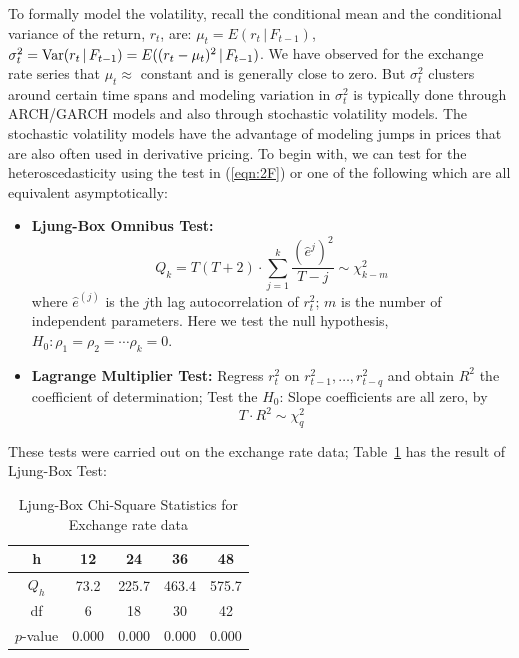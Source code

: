 To formally model the volatility, recall the conditional mean and the conditional variance of the return, $r_t$, are: $\mu_t = E(r_t \,|\,F_{t-1})$, $\sigma_t^2 = \operatorname{Var}(r_t\,|\,F_{t-1}) = E((r_t - \mu_t)^2\,|\,F_{t-1})$. We have observed for the exchange rate series that $\mu_t \approx$ constant and is generally close to zero. But $\sigma_t^2$ clusters around certain time spans and modeling variation in $\sigma_t^2$ is typically done through ARCH/GARCH models and also through stochastic volatility models. The stochastic volatility models have the advantage of modeling jumps in prices that are also often used in derivative pricing. To begin with, we can test for the heteroscedasticity using the test in (\ref{eqn:2F}) or one of the following which are all equivalent asymptotically:
\begin{itemize}
\item \textbf{Ljung-Box Omnibus Test:}
	\begin{equation}\label{eqn:2Qk}
	Q_k = T(T+2) \cdot \sum_{j=1}^k\frac{(\hat{e}^{j})^2}{T - j} \sim \chi_{k-m}^2
	\end{equation}
where $\hat{e}^{(j)}$ is the $j$th lag autocorrelation of $r_t^2$; $m$ is the number of independent parameters. Here we test the null hypothesis, $H_0: \rho_1 = \rho_2 = \cdots \rho_k = 0$.

\item \textbf{Lagrange Multiplier Test:} Regress $r_t^2$ on $r_{t-1}^2,\ldots,r_{t-q}^2$ and obtain $R^2$ the coefficient of determination; Test the $H_0$: Slope coefficients are all zero, by
	\begin{equation}\label{eqn:2TstarR}
	T \cdot R^2 \sim \chi_q^2
	\end{equation}
\end{itemize}
These tests were carried out on the exchange rate data; Table~\ref{tab:box} has the result of Ljung-Box Test: 
\begin{table}[!ht]
\centering
\caption{Ljung-Box Chi-Square Statistics for Exchange rate data \label{tab:box}}
	\begin{tabular}{ccccc}
	 h & 12 & 24 & 36 & 48 \\ \hline
	$Q_h$ & 73.2 & 225.7 & 463.4 & 575.7 \\ \hline
	df & 6 & 18 & 30 & 42 \\ \hline
	$p$-value & 0.000 & 0.000 & 0.000 & 0.000 \\
\end{tabular}
\end{table}


